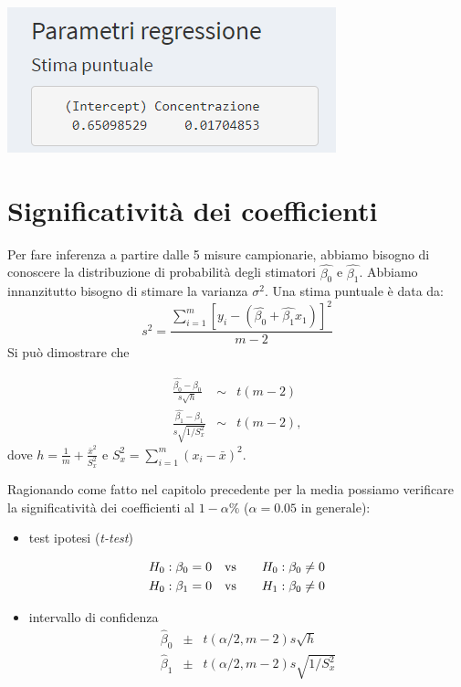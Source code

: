 \documentclass[
  11pt,
]{book}
\providecommand{\tightlist}{%
  \setlength{\itemsep}{0pt}\setlength{\parskip}{0pt}}
\begin{document}
\begin{center}\includegraphics[width=0.5\linewidth]{Immagini/Regressione/05_stima_pt} \end{center}

\hypertarget{significativituxe0-dei-coefficienti}{%
\section{Significatività dei coefficienti}\label{significativituxe0-dei-coefficienti}}

Per fare inferenza a partire dalle 5 misure campionarie, abbiamo bisogno di conoscere la distribuzione di probabilità degli stimatori \(\hat{\beta_0}\) e \(\hat{\beta_1}\). Abbiamo innanzitutto bisogno di stimare la varianza \(\sigma^2\). Una stima puntuale è data da:
\[
s^2=\frac{\sum_{i=1}^m[y_i-(\hat{\beta_0} + \hat{\beta_1}x_1)]^2}{m-2}
\]
Si può dimostrare che

\begin{eqnarray*}
\frac{\hat{\beta_0}-\beta_0}{s\sqrt{h}}&\sim&t(m-2)\\
\frac{\hat{\beta_1}-\beta_1}{s\sqrt{1/S^2_{x}}}&\sim&t(m-2),
\end{eqnarray*}
dove \(h=\frac{1}{m}+\frac{\bar{x}^2}{S^2_{x}}\) e \(S^2_{x}=\sum_{i=1}^m(x_i-\bar{x})^2\).

Ragionando come fatto nel capitolo precedente per la media possiamo verificare la significatività dei coefficienti al \(1-\alpha\%\) (\(\alpha=0.05\) in generale):

\begin{itemize}
\tightlist
\item
  test ipotesi (\emph{t-test})
\end{itemize}

\begin{eqnarray*}
H_0: \beta_0=0 \quad & \rm{vs} & \quad H_0: \beta_0\neq0 \\
H_0: \beta_1=0 \quad & \rm{vs} & \quad H_1: \beta_0\neq0
\end{eqnarray*}

\begin{itemize}
\tightlist
\item
  intervallo di confidenza
  \begin{eqnarray*}
  \hat\beta_0 & \pm & t(\alpha/2,m-2)s\sqrt{h} \\
  \hat\beta_1 & \pm & t(\alpha/2,m-2)s\sqrt{1/S^2_{x}}
  \end{eqnarray*}
\end{itemize}
\end{document}
